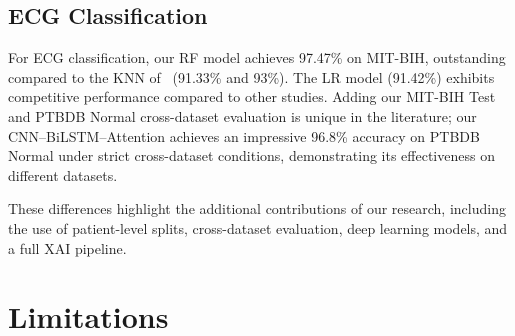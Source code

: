 \documentclass[10pt, twocolumn]{article}
\begin{document}
\subsection{ECG Classification}

For ECG classification, our RF model achieves 97.47\% on MIT-BIH, outstanding compared to
the KNN of~\cite{fira2012} (91.33\% and 93\%).
The LR model (91.42\%) exhibits competitive performance compared to other studies.
Adding our MIT-BIH Test and PTBDB Normal cross-dataset evaluation is unique in the
literature; our CNN--BiLSTM--Attention achieves an impressive 96.8\% accuracy on PTBDB
Normal under strict cross-dataset conditions, demonstrating its effectiveness on different
datasets.

\begin{table}[H]
\centering
\caption{Our Results -- Summary.}
\label{tab:our_results}
\end{table}

These differences highlight the additional contributions of our research, including the use of
patient-level splits, cross-dataset evaluation, deep learning models, and a full XAI pipeline.

\section{Limitations}
\end{document}
